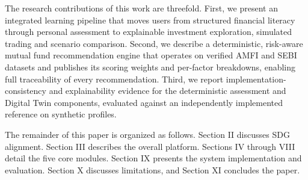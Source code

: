 The research contributions of this work are threefold. First, we present an integrated learning pipeline that moves users from structured financial literacy through personal assessment to explainable investment exploration, simulated trading and scenario comparison. Second, we describe a deterministic, risk-aware mutual fund recommendation engine that operates on verified AMFI and SEBI datasets and publishes its scoring weights and per-factor breakdowns, enabling full traceability of every recommendation. Third, we report implementation-consistency and explainability evidence for the deterministic assessment and Digital Twin components, evaluated against an independently implemented reference on synthetic profiles.

The remainder of this paper is organized as follows. Section II discusses SDG alignment. Section III describes the overall platform. Sections IV through VIII detail the five core modules. Section IX presents the system implementation and evaluation. Section X discusses limitations, and Section XI concludes the paper.